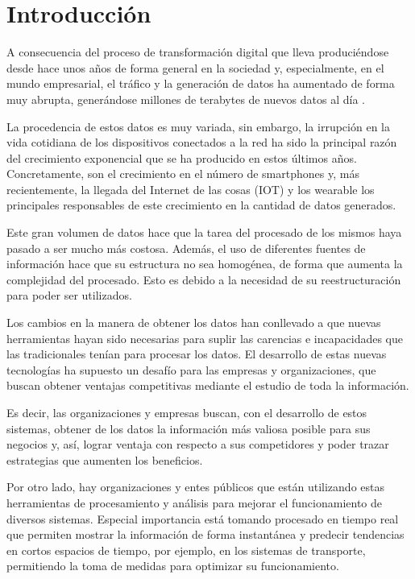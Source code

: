 \chapter{Introducción \label{sec:intro}}

A consecuencia del proceso de transformación digital que lleva produciéndose desde hace unos años de forma general en la sociedad y, especialmente, en el mundo empresarial, el tráfico y la generación de datos ha aumentado de forma muy abrupta, generándose millones de terabytes de nuevos datos al día \cite{BDStats}. 

La procedencia de estos datos es muy variada, sin embargo, la irrupción en la vida cotidiana de los dispositivos conectados a la red ha sido la principal razón del crecimiento exponencial que se ha producido en estos últimos años. Concretamente, son el crecimiento en el número de smartphones \cite{phoneGrowth} y, más recientemente, la llegada del Internet de las cosas (IOT) y los wearable los principales responsables de este crecimiento en la cantidad de datos generados. 

Este gran volumen de datos hace que la tarea del procesado de los mismos haya pasado a ser mucho más costosa. Además, el uso de diferentes fuentes de información hace que su estructura no sea homogénea, de forma que aumenta la complejidad del procesado. Esto es debido a la necesidad de su reestructuración para poder ser utilizados.

Los cambios en la manera de obtener los datos han conllevado a que nuevas herramientas hayan sido necesarias para suplir las carencias e incapacidades que las tradicionales tenían para procesar los datos. El desarrollo de estas nuevas tecnologías ha supuesto un desafío para las empresas y organizaciones, que buscan obtener ventajas competitivas mediante el estudio de toda la información.

Es decir, las organizaciones y empresas buscan, con el desarrollo de estos sistemas, obtener de los datos la información más valiosa posible para sus negocios y, así, lograr ventaja con respecto a sus competidores y poder trazar estrategias que aumenten los beneficios.

Por otro lado, hay organizaciones y entes públicos que están utilizando estas herramientas de procesamiento y análisis para mejorar el funcionamiento de diversos sistemas. Especial importancia está tomando procesado en tiempo real que permiten mostrar la información de forma instantánea y predecir tendencias en cortos espacios de tiempo, por ejemplo, en los sistemas de transporte, permitiendo la toma de medidas para optimizar su funcionamiento. 

